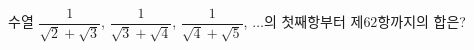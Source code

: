 수열 $\dfrac{1}{\sqrt{2}+\sqrt{3}}$, $\dfrac{1}{\sqrt{3}+\sqrt{4}}$, $\dfrac{1}{\sqrt{4}+\sqrt{5}}$, $\ldots$의 첫째항부터 제$62$항까지의 합은?
